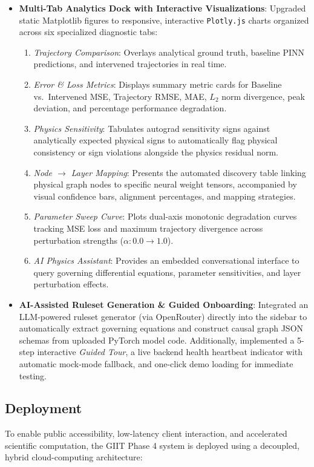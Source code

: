 \documentclass[12pt,singleside,a4paper]{article}
\begin{document}
\begin{itemize}
    \item \textbf{Multi-Tab Analytics Dock with Interactive Visualizations}: Upgraded static Matplotlib figures to responsive, interactive \texttt{Plotly.js} charts organized across six specialized diagnostic tabs:
    \begin{enumerate}
        \item \textit{Trajectory Comparison}: Overlays analytical ground truth, baseline PINN predictions, and intervened trajectories in real time.
        \item \textit{Error \& Loss Metrics}: Displays summary metric cards for Baseline vs.\ Intervened MSE, Trajectory RMSE, MAE, $L_2$ norm divergence, peak deviation, and percentage performance degradation.
        \item \textit{Physics Sensitivity}: Tabulates autograd sensitivity signs against analytically expected physical signs to automatically flag physical consistency or sign violations alongside the physics residual norm.
        \item \textit{Node $\rightarrow$ Layer Mapping}: Presents the automated discovery table linking physical graph nodes to specific neural weight tensors, accompanied by visual confidence bars, alignment percentages, and mapping strategies.
        \item \textit{Parameter Sweep Curve}: Plots dual-axis monotonic degradation curves tracking MSE loss and maximum trajectory divergence across perturbation strengths ($\alpha : 0.0 \rightarrow 1.0$).
        \item \textit{AI Physics Assistant}: Provides an embedded conversational interface to query governing differential equations, parameter sensitivities, and layer perturbation effects.
    \end{enumerate}
    \item \textbf{AI-Assisted Ruleset Generation \& Guided Onboarding}: Integrated an LLM-powered ruleset generator (via OpenRouter) directly into the sidebar to automatically extract governing equations and construct causal graph JSON schemas from uploaded PyTorch model code. Additionally, implemented a 5-step interactive \textit{Guided Tour}, a live backend health heartbeat indicator with automatic mock-mode fallback, and one-click demo loading for immediate testing.
\end{itemize}
\subsection{Deployment}
To enable public accessibility, low-latency client interaction, and accelerated scientific computation, the GIIT Phase 4 system is deployed using a decoupled, hybrid cloud-computing architecture:
\end{document}
